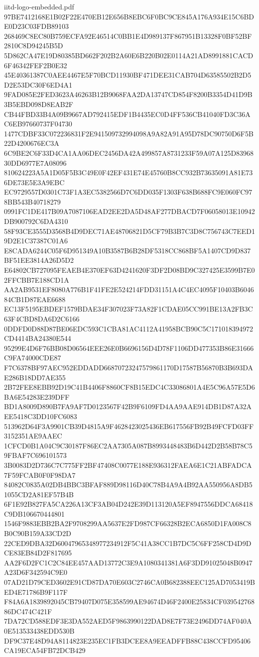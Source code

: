 \begin{filecontents*}[overwrite]{iitd-logo-embedded.pdf}
97BE7412168E1B02F22E470EB12E656B8EBC6F0BC9CE845A176A934E15C6BDE0D23C03FDB89103
268469C8EC80B759ECFA92E46514C0BB1E4D989137F867951B13328F0BF52BF2810C8D94245B5D
5D862CA47E19D80385BD662F202B2A60E6B220B02E0114A21AD8991881CACD6F46342FEF2B0E32
45E40361387C0AEE4467E5F70BCD11930BF471DEE31CAB704D63585502B2D5D2E53DC30F6ED4A1
9FAD085E2FED3623A46263B12B9068FAA2DA13747CD854F8200B3354D41D9B3B5EBD098D8EAB2F
CB44FBD33B4A09B9667AD792415EDF1B4435EC0D4FF536CB41040FD3C36AC6EB97660737F04730
1477CDBF33C072236831F2E941509732994098A9A82A91A95D78DC90750D6F5B22D4200676EC3A
6C9BE2C6F33D4CA1AA06DEC2456DA42A499857A8731233F59A07A125D8396830DD6977E7A08096
810624223A5A1D05F5B3C49E0F42EF431E74E45760B8CC932B73635091A81E736DE73E5E3A9EBC
EC9729557D0301C73F1A3EC5382566D7C6DD035F1303F638B688FC9E060FC978BB543B40718279
0991FC1DE417B09A7087106EAD2EE2DA5D48AF277DBACD7F06058013E10942DB900792C6DA4310
58F93CE3555D3568B4D9DEC71AE48706821D5CF79B3B7C3D8C756743C7EED19D2E1C37387C01A6
E8CADA6244C05F6D951349A10B3587B6B28DF5318CC868BF5A1407CD9D837BF51EE3814A26D5D2
E64802CB727095FEAEB4E370EF63D4241620F3DF2D08BD9C327425E3599B7E02FFCBB7E188CD1A
AA2AB9531EF8080A776B1F41FE2E524214FDD31151A4C4EC4095F10403B604684CB1D87EAE6688
EC13F5195EBDEF1579BDAE34F307023F73A82F1CDAE05CC991BE13A2FB3C63F4CBD8DA6D2C6166
0DDFD0D88D87BE06EDC593C1CBA81AC4112A41958BCB90C5C171018394972CD4414BA24380E544
95299E4D6F76BB08D06564EEE26E0B6696156D4D78F1106DD477353B86E31666C9FA74000CDE87
F7C6378BF97AEC952EDDADD66870723247579861170D17587B56870B3B693DAE286B18DD7AE355
2B72FEE8EBB92D19C41B4406F8860CF8B15EDC4C33086801A4E5C96A57E5D6BA6E54283E239DFF
BD1A8009D890B7FA9AF7D0123567F42B9F6109FD4AA9AAE914DB1D87A32AEE5418C3DD10FC6083
513962D64F3A9901CB39D4815A9F4628423025436EB617556FB92B49FCFD03FF3152351AE9AAEC
1CFCD0B1A04C9C30187F86EC2AA7305A087B8993448483B6D442D2B58B78C59FBAF7C696101573
3B0083D2D736C7C775FF2BF47408C0077E188E936312FAEA6E1C21ABFADCA7F59FCAB0F0F98DA7
84082C0835A02DB4BBC3BFAF889D98116D40C78B4A9A4B92AA550956A8DB51055CD2A81EF57B4B
6F1E92B827FA5CA226A13CF3AB04D242E39D113120A5EF8947556DDCA68418C9DB106670444801
1546F9883EBB2BA2F9708299AA5637E2FD987CF66328B2ECA6850D1FA008C8B0C90B159A33CD2D
22CED9DBA32D60047965348977234912F5C41A38CC1B7DC5C6FF258CD4D9DCE83EB84D2F817695
AA2F6D2FC1C2C84EE457AAD13772C3E9A1080341381A6F3DD91025048B0947A23D6F342594C9E0
07AD21D79CED3602E91CD87DA70E603C2746CA0B682388EEC125AD7053419BED4E71786B9F117F
F84A6A1839892045CB79407D075E358599AE94674D46F2400E25834CF03954276886DC474C421F
7DA72CD588EDF3E3DA552AED5F9863990122DAD8E7F73E2496DD74AF040A0E513533438EDD530B
DF9C37E48D94A8114823E235EC1FB3DCEE8A9EEADFFB88C438CCFD95406CA19ECA54FB72DCB429

\end{filecontents*}
